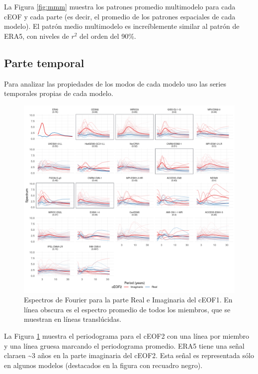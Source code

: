 \documentclass[12pt,oneside]{reedthesis}
\begin{document}
La Figura \ref{fig:mmm} muestra los patrones promedio multimodelo para cada cEOF y cada parte (es decir, el promedio de los patrones espaciales de cada modelo).
El patrón medio multimodelo es increíblemente similar al patrón de ERA5, con niveles de \(r^2\) del orden del 90\%.

\hypertarget{parte-temporal}{%
\subsection{Parte temporal}\label{parte-temporal}}

Para analizar las propiedades de los modos de cada modelo uso las series temporales propias de cada modelo.

\begin{figure}
\includegraphics{figures/50-cmip6/fft-ceof2-1} \caption{Espectros de Fourier para la parte Real e Imaginaria del cEOF1.
En línea obscura es el espectro promedio de todos los miembros, que se muestran en líneas translúcidas.}\label{fig:fft-ceof2}
\end{figure}




La Figura \ref{fig:fft-ceof2} muestra el periodograma para el cEOF2 con una línea por miembro y una línea gruesa marcando el periodograma promedio.
ERA5 tiene una señal claraen \textasciitilde3 años en la parte imaginaria del cEOF2.
Esta señal es representada sólo en algunos modelos (destacados en la figura con recuadro negro).
\end{document}
